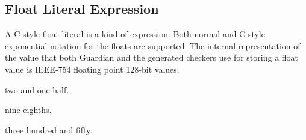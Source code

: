 
\subsection{Float Literal Expression}
{
	A C-style float literal is a kind of expression.
	Both normal and C-style exponential notation for the floats are supported.
	The internal representation of the value that both Guardian and the
	generated checkers use for storing a float value is IEEE-754 floating point
	128-bit values.
	
	\begin{itemize}
	{
		\item[\texttt{2.5}] two and one half.
		
		\item[\texttt{1.125}] nine eighths.
		
		\item[\texttt{3.5e2}] three hundred and fifty.
	}
	\end{itemize}
}

